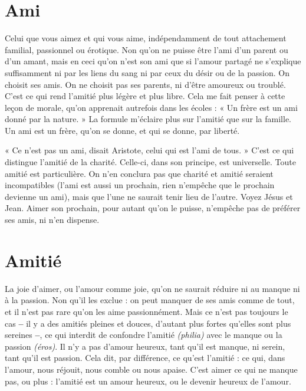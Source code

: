 \section{Ami}
Celui que vous aimez et qui vous aime, indépendamment de tout attachement
familial, passionnel ou érotique. Non qu'on ne puisse être
l'ami d’un parent ou d’un amant, mais en ceci qu’on n'est son ami que si
l'amour partagé ne s'explique suffisamment ni par les liens du sang ni par ceux
du désir ou de la passion. On choisit ses amis. On ne choisit pas ses parents, ni
d’être amoureux ou troublé. C’est ce qui rend l'amitié plus légère et plus libre.
Cela me fait penser à cette leçon de morale, qu’on apprenait autrefois dans les
écoles : « Un frère est un ami donné par la nature. » La formule m’éclaire plus
sur l'amitié que sur la famille. Un ami est un frère, qu’on se donne, et qui se
donne, par liberté.

« Ce n’est pas un ami, disait Aristote, celui qui est l’ami de tous. » C’est ce
qui distingue l’amitié de la charité. Celle-ci, dans son principe, est universelle.
Toute amitié est particulière. On n’en conclura pas que charité et amitié
seraient incompatibles (l'ami est aussi un prochain, rien n’empêche que le prochain
devienne un ami), mais que l’une ne saurait tenir lieu de l’autre. Voyez
Jésus et Jean. Aimer son prochain, pour autant qu’on le puisse, n'empêche pas
de préférer ses amis, ni n’en dispense.

\section{Amitié}
La joie d’aimer, ou l’amour comme joie, qu’on ne saurait réduire ni
au manque ni à la passion. Non qu’il les exclue : on peut manquer
de ses amis comme de tout, et il n’est pas rare qu’on les aime passionnément.
Mais ce n’est pas toujours le cas {\bf --} il y a des amitiés pleines et douces, d’autant
plus fortes qu’elles sont plus sereines {\bf --}, ce qui interdit de confondre l’amitié
{\it (philia)} avec le manque ou la passion {\it (éros)}. Il n’y a pas d’amour heureux, tant
qu’il est manque, ni serein, tant qu’il est passion. Cela dit, par différence, ce
qu'est l’amitié : ce qui, dans l’amour, nous réjouit, nous comble ou nous
apaise. C’est aimer ce qui ne manque pas, ou plus : l'amitié est un amour heureux,
ou le devenir heureux de l'amour.


